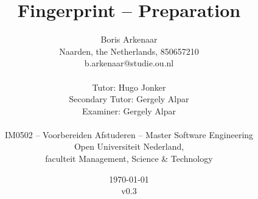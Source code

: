 \title{Fingerprint -- Preparation}
\author{
  Boris Arkenaar\\
  Naarden, the Netherlands, 850657210\\
  b.arkenaar@studie.ou.nl\\
  \\
  Tutor: Hugo Jonker\\
  Secondary Tutor: Gergely Alpar\\
  Examiner: Gergely Alpar\\
  \\
  IM0502 -- Voorbereiden Afstuderen -- Master Software Engineering\\
  Open Universiteit Nederland,\\
  faculteit Management, Science \& Technology}
\date{\today\\v0.3}
\maketitle
